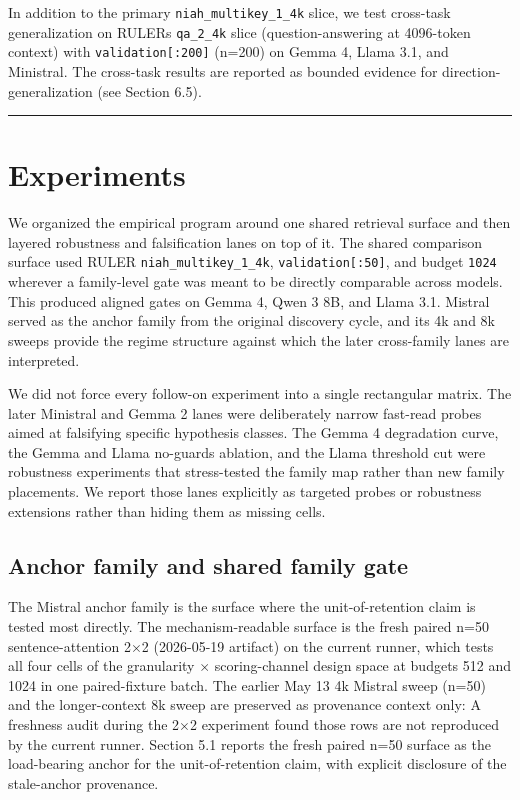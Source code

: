 \documentclass[10pt]{article}
\begin{document}
In addition to the primary \texttt{niah\_multikey\_1\_4k} slice, we test
cross-task generalization on RULER\textquotesingle s \texttt{qa\_2\_4k}
slice (question-answering at 4096-token context) with
\texttt{validation{[}:200{]}} (n=200) on Gemma 4, Llama 3.1, and
Ministral. The cross-task results are reported as bounded evidence
for direction-generalization (see Section 6.5).

\begin{center}\rule{0.5\linewidth}{0.5pt}\end{center}

\section{Experiments}\label{4-experiments}

We organized the empirical program around one shared retrieval surface
and then layered robustness and falsification lanes on top of it. The
shared comparison surface used RULER \texttt{niah\_multikey\_1\_4k},
\texttt{validation{[}:50{]}}, and budget \texttt{1024} wherever a
family-level gate was meant to be directly comparable across models.
This produced aligned gates on Gemma 4, Qwen 3 8B, and Llama 3.1.
Mistral served as the anchor family from the original
discovery cycle, and its 4k and 8k sweeps provide the regime structure
against which the later cross-family lanes are interpreted.

We did not force every follow-on experiment into a single rectangular
matrix. The later Ministral and Gemma 2 lanes were deliberately
narrow fast-read probes aimed at falsifying specific hypothesis classes.
The Gemma 4 degradation curve, the Gemma and Llama no-guards ablation,
and the Llama threshold cut were robustness experiments that
stress-tested the family map rather than new family placements. We
report those lanes explicitly as targeted probes or robustness
extensions rather than hiding them as missing cells.

\subsection{Anchor family and shared family gate}\label{41-anchor-family-and-shared-family-gate}

The Mistral anchor family is the surface where the
unit-of-retention claim is tested most directly. The mechanism-readable
surface is the fresh paired n=50 sentence-attention 2$\times$2 (2026-05-19
artifact) on the current runner, which tests all four cells of the
granularity $\times$ scoring-channel design space at budgets 512 and 1024 in
one paired-fixture batch. The earlier May 13 4k Mistral sweep (n=50) and
the longer-context 8k sweep are preserved as provenance context only: A
freshness audit during the 2$\times$2 experiment found those rows are not
reproduced by the current runner. Section 5.1 reports the fresh paired
n=50 surface as the load-bearing anchor for the unit-of-retention claim,
with explicit disclosure of the stale-anchor provenance.
\end{document}
